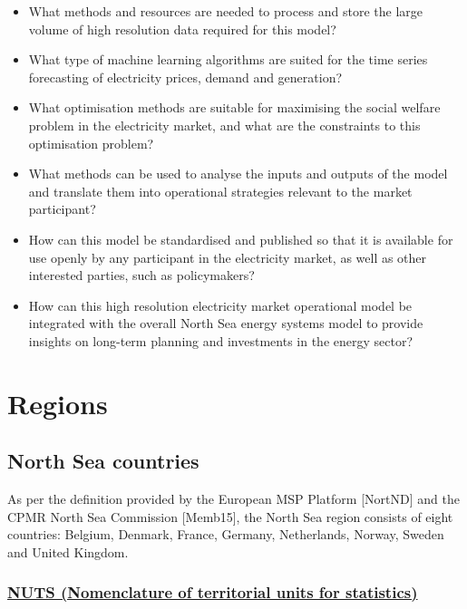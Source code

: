 \begin{itemize}
\tightlist
\item
  What methods and resources are needed to process and store the large
  volume of high resolution data required for this model?
\item
  What type of machine learning algorithms are suited for the time
  series forecasting of electricity prices, demand and generation?
\item
  What optimisation methods are suitable for maximising the social
  welfare problem in the electricity market, and what are the
  constraints to this optimisation problem?
\item
  What methods can be used to analyse the inputs and outputs of the
  model and translate them into operational strategies relevant to the
  market participant?
\item
  How can this model be standardised and published so that it is
  available for use openly by any participant in the electricity market,
  as well as other interested parties, such as policymakers?
\item
  How can this high resolution electricity market operational model be
  integrated with the overall North Sea energy systems model to provide
  insights on long-term planning and investments in the energy sector?
\end{itemize}

\hypertarget{regions}{%
\section{Regions}\label{regions}}

\hypertarget{north-sea-countries}{%
\subsection{North Sea countries}\label{north-sea-countries}}

As per the definition provided by the European MSP Platform {[}NortND{]}
and the CPMR North Sea Commission {[}Memb15{]}, the North Sea region
consists of eight countries: Belgium, Denmark, France, Germany,
Netherlands, Norway, Sweden and United Kingdom.

\hypertarget{nuts-nomenclature-of-territorial-units-for-statistics}{%
\subsubsection{\texorpdfstring{\href{https://ec.europa.eu/eurostat/web/nuts/background}{NUTS
(Nomenclature of territorial units for
statistics)}}{NUTS (Nomenclature of territorial units for statistics)}}\label{nuts-nomenclature-of-territorial-units-for-statistics}}

